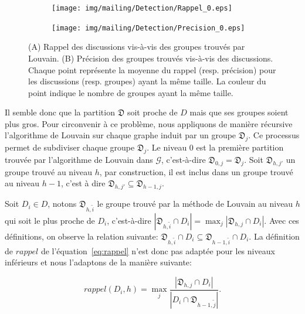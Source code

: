 \begin{figure}
\centering

\hfill
	\begin{subfigure}{0.45\textwidth}
		\texttt{[image: img/mailing/Detection/Rappel\_0.eps]}
		\caption{}		
	\end{subfigure}\hfill
	\begin{subfigure}{0.45\textwidth}
		\texttt{[image: img/mailing/Detection/Precision\_0.eps]}
		\caption{}		
	\end{subfigure}\hfill

\caption{(A) Rappel des discussions vis-à-vis des groupes trouvés par Louvain.
 (B) Précision des groupes trouvés vis-à-vis des discussions.
Chaque point représente la moyenne du rappel (resp. précision) pour les discussions (resp. groupes) ayant la même taille.
La couleur du point indique le nombre de groupes ayant la même taille.}
\label{fig:rec_inclusion_niveau0}
\end{figure}


Il semble donc que la partition $\mathfrak{D}$ soit proche de $D$ mais que ses groupes soient plus gros.
Pour circonvenir à ce problème, nous appliquons de manière récursive l'algorithme de Louvain sur chaque graphe induit par un groupe $\mathfrak{D}_j$.
Ce processus permet de subdiviser chaque groupe $\mathfrak{D}_j$.
Le niveau $0$ est la première partition trouvée par l'algorithme de Louvain dans $\mathcal{G}$, c'est-à-dire $\mathfrak{D}_{0,j}=\mathfrak{D}_j$.
Soit $\mathfrak{D}_{h,j'}$ un groupe trouvé au niveau $h$, par construction, il est inclus dans un groupe trouvé au niveau $h-1$, c'est à dire $\mathfrak{D}_{h,j'} \subseteq \mathfrak{D}_{h-1,j}$.


Soit $D_i \in D$, notons $\mathfrak{D}_{h,\tilde{i}}$ le groupe trouvé par la méthode de Louvain au niveau $h$ qui soit le plus proche de $D_i$, c'est-à-dire $|\mathfrak{D}_{h,\tilde{i}}\cap D_i|= \max_{j} |\mathfrak{D}_{h,j} \cap D_i|$.
Avec ces définitions, on observe la relation suivante: $\mathfrak{D}_{h,\tilde{i}}\cap D_i \subseteq \mathfrak{D}_{h-1,\tilde{i}}\cap D_i$.
La définition de $rappel$ de l'équation~\ref{eq:rappel} n'est donc pas adaptée pour les niveaux inférieurs et nous l'adaptons de la manière suivante:

\begin{equation}
rappel(D_i,h)= \max_{j} \frac{|\mathfrak{D}_{h,j} \cap D_i|}{|D_i \cap \mathfrak{D}_{h-1,\tilde{j}}|}.
\end{equation}

